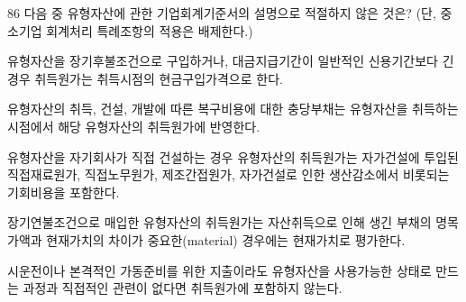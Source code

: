 \begin{question}{86}
다음 중 유형자산에 관한 기업회계기준서의 설명으로 적절하지 않은 것은? (단, 중소기업 회계처리 특례조항의 적용은 배제한다.)
\begin{choices}
  \item 유형자산을 장기후불조건으로 구입하거나, 대금지급기간이 일반적인 신용기간보다 긴 경우 취득원가는 취득시점의 현금구입가격으로 한다.
  \item 유형자산의 취득, 건설, 개발에 따른 복구비용에 대한 충당부채는 유형자산을 취득하는 시점에서 해당 유형자산의 취득원가에 반영한다.
  \item 유형자산을 자기회사가 직접 건설하는 경우 유형자산의 취득원가는 자가건설에 투입된 직접재료원가, 직접노무원가, 제조간접원가, 자가건설로 인한 생산감소에서 비롯되는 기회비용을 포함한다.
  \item 장기연불조건으로 매입한 유형자산의 취득원가는 자산취득으로 인해 생긴 부채의 명목가액과 현재가치의 차이가 중요한(material) 경우에는 현재가치로 평가한다.
  \item 시운전이나 본격적인 가동준비를 위한 지출이라도 유형자산을 사용가능한 상태로 만드는 과정과 직접적인 관련이 없다면 취득원가에 포함하지 않는다.
\end{choices}
\end{question}
